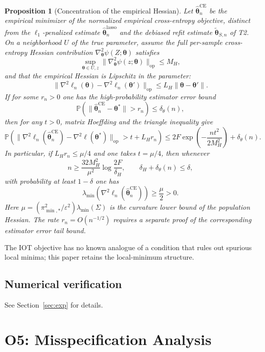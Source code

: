 \documentclass[11pt,a4paper]{article}
\newtheorem{proposition}[theorem]{Proposition}
\theoremstyle{remark}
\begin{document}
\begin{proposition}[Concentration of the empirical Hessian]\label{prop:hess_conc}
Let $\widehat{\bm{\theta}}_n^{\mathrm{CE}}$ be the empirical minimizer of the normalized
empirical cross-entropy objective, distinct from the $\ell_1$-penalized estimate
$\widehat{\bm{\theta}}_n^{\mathrm{lasso}}$ and the debiased refit estimate
$\widetilde{\bm{\theta}}_{S,n}$ of T2. On a neighborhood $U$ of the true parameter, assume
the full per-sample cross-entropy Hessian contribution $\nabla_{\bm{\theta}}^2\psi(Z;\bm{\theta})$
satisfies
\[
\sup_{\bm{\theta}\in U,z}\|\nabla_{\bm{\theta}}^2\psi(z;\bm{\theta})\|_{\mathrm{op}}\le M_H,
\]
and that the empirical Hessian is Lipschitz in the parameter:
\[
\|\nabla^2\ell_n(\bm{\theta})-\nabla^2\ell_n(\bm{\theta}')\|_{\mathrm{op}}
\le L_H\|\bm{\theta}-\bm{\theta}'\|.
\]
If for some $r_n>0$ one has the high-probability estimator error bound
\[
\mathbb P\left(\|\widehat{\bm{\theta}}_n^{\mathrm{CE}}-\bm{\theta}^*\|>r_n\right)\le\delta_\theta(n),
\]
then for any $t>0$, matrix Hoeffding and the triangle inequality give
\[
\mathbb P\left(
\|\nabla^2\ell_n(\widehat{\bm{\theta}}_n^{\mathrm{CE}})-\nabla^2\ell(\bm{\theta}^*)\|_{\mathrm{op}}>t+L_Hr_n
\right)
\le 2F\exp\left(-\frac{nt^2}{2M_H^2}\right)+\delta_\theta(n).
\]
In particular, if $L_Hr_n\le\mu/4$ and one takes $t=\mu/4$, then whenever
\[
n\ge\frac{32M_H^2}{\mu^2}\log\frac{2F}{\delta_H},
\qquad
\delta_H+\delta_\theta(n)\le\delta,
\]
with probability at least $1-\delta$ one has
\[
\lambda_{\min}\left(\nabla^2\ell_n(\widehat{\bm{\theta}}_n^{\mathrm{CE}})\right)\ge\frac\mu2>0.
\]
Here $\mu=(\pi_{\min,*}^2/\varepsilon^2)\lambda_{\min}(\Sigma)$ is the curvature lower
bound of the population Hessian. The rate $r_n=O(n^{-1/2})$ requires a separate proof of
the corresponding estimator error tail bound.
\end{proposition}

The IOT objective has no known analogue of a condition that rules out spurious local
minima; this paper retains the local-minimum structure.

\subsection{Numerical verification}

See Section~\ref{sec:exp} for details.

\section{O5: Misspecification Analysis}\label{sec:t5}
\end{document}
